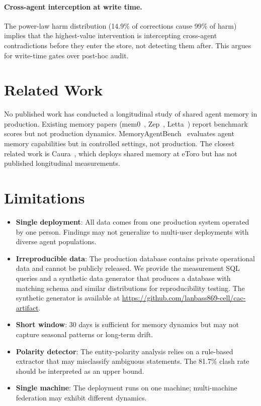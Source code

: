 \documentclass[11pt]{article}
\begin{document}
\paragraph{Cross-agent interception at write time.} The power-law harm distribution (14.9\% of corrections cause 99\% of harm) implies that the highest-value intervention is intercepting cross-agent contradictions before they enter the store, not detecting them after. This argues for write-time gates over post-hoc audit.

\section{Related Work}
\label{sec:related}

No published work has conducted a longitudinal study of shared agent memory in production. Existing memory papers (mem0~\cite{mem0}, Zep~\cite{zep}, Letta~\cite{letta}) report benchmark scores but not production dynamics. MemoryAgentBench~\cite{mab} evaluates agent memory capabilities but in controlled settings, not production. The closest related work is Caura~\cite{caura}, which deploys shared memory at eToro but has not published longitudinal measurements.

\section{Limitations}
\label{sec:limitations}

\begin{itemize}
\item \textbf{Single deployment}: All data comes from one production system operated by one person. Findings may not generalize to multi-user deployments with diverse agent populations.
\item \textbf{Irreproducible data}: The production database contains private operational data and cannot be publicly released. We provide the measurement SQL queries and a synthetic data generator that produces a database with matching schema and similar distributions for reproducibility testing. The synthetic generator is available at \url{https://github.com/lanbass869-cell/cac-artifact}.
\item \textbf{Short window}: 30 days is sufficient for memory dynamics but may not capture seasonal patterns or long-term drift.
\item \textbf{Polarity detector}: The entity-polarity analysis relies on a rule-based extractor that may misclassify ambiguous statements. The 81.7\% clash rate should be interpreted as an upper bound.
\item \textbf{Single machine}: The deployment runs on one machine; multi-machine federation may exhibit different dynamics.
\end{itemize}
\end{document}
